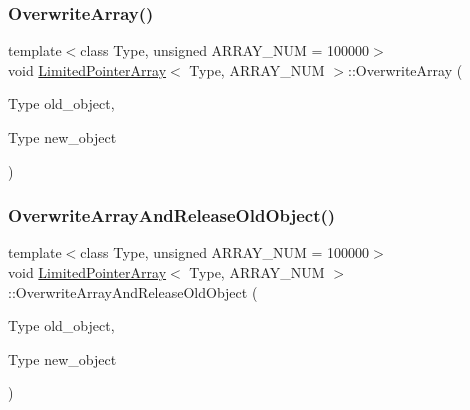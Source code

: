 \mbox{\label{class_limited_pointer_array_a7cf64a1731ab6d0d63182b6c223fae0b}} 
\subsubsection{\texorpdfstring{Overwrite\+Array()}{OverwriteArray()}}
{\footnotesize\ttfamily template$<$class Type, unsigned A\+R\+R\+A\+Y\+\_\+\+N\+UM = 100000$>$ \\
void \mbox{\hyperlink{class_limited_pointer_array}{Limited\+Pointer\+Array}}$<$ Type, A\+R\+R\+A\+Y\+\_\+\+N\+UM $>$\+::Overwrite\+Array (\begin{DoxyParamCaption}\item[{Type}]{old\+\_\+object,  }\item[{Type}]{new\+\_\+object }\end{DoxyParamCaption})\hspace{0.3cm}{\ttfamily [inline]}}

\mbox{\label{class_limited_pointer_array_a6c46bb77df04a9e1226025f8c48e26cb}} 
\subsubsection{\texorpdfstring{Overwrite\+Array\+And\+Release\+Old\+Object()}{OverwriteArrayAndReleaseOldObject()}}
{\footnotesize\ttfamily template$<$class Type, unsigned A\+R\+R\+A\+Y\+\_\+\+N\+UM = 100000$>$ \\
void \mbox{\hyperlink{class_limited_pointer_array}{Limited\+Pointer\+Array}}$<$ Type, A\+R\+R\+A\+Y\+\_\+\+N\+UM $>$\+::Overwrite\+Array\+And\+Release\+Old\+Object (\begin{DoxyParamCaption}\item[{Type}]{old\+\_\+object,  }\item[{Type}]{new\+\_\+object }\end{DoxyParamCaption})\hspace{0.3cm}{\ttfamily [inline]}}

